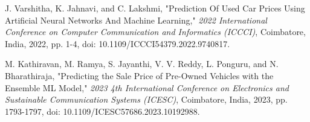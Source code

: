 \documentclass[a4paper,12pt]{article}
\begin{document}
\begin{justify}
\begin{thebibliography}{9}
J. Varshitha, K. Jahnavi, and C. Lakshmi, "Prediction Of Used Car Prices Using Artificial Neural Networks And Machine Learning," \textit{2022 International Conference on Computer Communication and Informatics (ICCCI)}, Coimbatore, India, 2022, pp. 1-4, doi: 10.1109/ICCCI54379.2022.9740817.


M. Kathiravan, M. Ramya, S. Jayanthi, V. V. Reddy, L. Ponguru, and N. Bharathiraja, "Predicting the Sale Price of Pre-Owned Vehicles with the Ensemble ML Model," \textit{2023 4th International Conference on Electronics and Sustainable Communication Systems (ICESC)}, Coimbatore, India, 2023, pp. 1793-1797, doi: 10.1109/ICESC57686.2023.10192988.


\end{thebibliography}

\end{justify}
\end{document}
